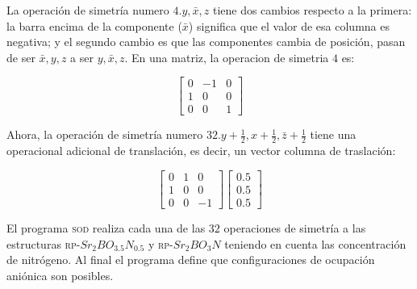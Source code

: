 La operación de simetría numero $4. y,\bar{x},z$ tiene dos cambios respecto a la primera: la barra encima de la componente ($\bar{x}$) significa que el valor de esa columna es negativa; y el segundo cambio es que las componentes cambia de posición, pasan de ser $\bar{x},y,z$ a ser $y,\bar{x},z$. En una matriz, la operacion de simetria $4$ es:

\begin{equation*}
    \begin{bmatrix}
     0& -1 &0 \\ 
     1& 0 & 0\\ 
     0& 0 & 1
    \end{bmatrix} 
\end{equation*} 

Ahora, la operación de simetría numero $32. y+\frac{1}{2},x+\frac{1}{2},\bar{z}+\frac{1}{2}$ tiene una operacional adicional de translación, es decir, un vector columna de traslación:

\begin{equation*}
    \begin{bmatrix}
     0& 1 &0 \\ 
     1& 0 & 0\\ 
     0& 0 & -1
    \end{bmatrix}\begin{bmatrix}
     0.5 \\
     0.5 \\
     0.5
    \end{bmatrix} 
\end{equation*} 


El programa \textsc{sod} realiza cada una de las $32$ operaciones de simetría a las estructuras \textsc{rp}-$Sr_{2}BO_{3.5}N_{0.5}$ y \textsc{rp}-$Sr_{2}BO_{3}N$ teniendo en cuenta las concentración de nitrógeno. Al final el programa define que configuraciones de ocupación aniónica son posibles.
